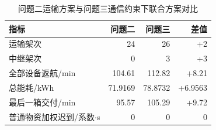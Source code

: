 \begin{table}[H]\centering\small
\caption{问题二运输方案与问题三通信约束下联合方案对比}\label{tab:q2_q3_compare}
\begin{tabular}{lrrr}
\toprule
指标 & 问题二 & 问题三 & 差值\\\midrule
运输架次 & 24 & 26 & +2\\
中继架次 & 0 & 3 & +3\\
全部设备返航/min & 104.61 & 112.82 & +8.21\\
总能耗/kWh & 71.9169 & 78.8732 & +6.9563\\
最后一箱交付/min & 95.57 & 105.29 & +9.72\\
普通物资加权迟到/系数$\cdot$s & 0 & 0 & 0\\
\bottomrule\end{tabular}
\end{table}
